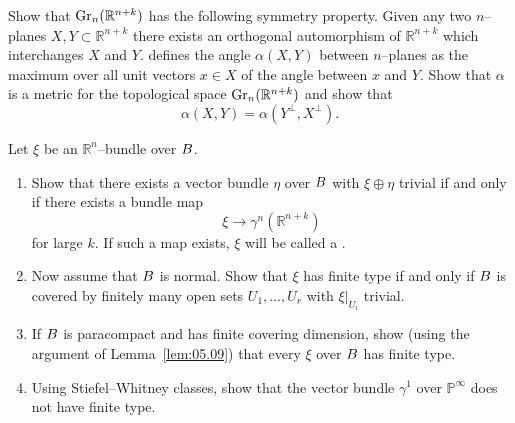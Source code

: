 \documentclass[../main]{subfiles}
\begin{document}
\begin{problem}\label{prob-5-D}
Show that $\operatorname{Gr}_n({\mathbb R}^{n + k})$ has the following symmetry property. Given any two $n$--planes $X, Y \subset {\mathbb R}^{n + k}$ there exists an orthogonal automorphism of ${\mathbb R}^{n + k}$ which interchanges $X$ and $Y$. \cite{whitehead1961} defines the angle $\alpha(X, Y)$ between $n$--planes as the maximum over all unit vectors $x \in X$ of the angle between $x$ and $Y$. Show that $\alpha$ is a metric for the topological space $\operatorname{Gr}_n({\mathbb R}^{n + k})$ and show that \[\alpha(X, Y) = \alpha(Y^\bot, X^\bot).\]
\end{problem}

\begin{problem}\label{prob-5-E}
Let $\xi$ be an ${\mathbb R}^n$--bundle over $B$. 

\begin{enumerate}[label=\arabic*)]
    \item Show that there exists a vector bundle $\eta$ over $B$ with $\xi \oplus \eta$ trivial if and only if there exists a bundle map \[\xi \longrightarrow \gamma^n({\mathbb R}^{n + k})\] for large $k$. If such a map exists, $\xi$ will be called a .
    \item Now assume that $B$ is normal. Show that $\xi$ has finite type if and only if $B$ is covered by finitely many open sets $U_1, \ldots, U_r$ with $\xi |_{U_i}$ trivial.
    \item If $B$ is paracompact and has finite covering dimension, show (using the argument of Lemma~\ref{lem:05.09}) that every $\xi$ over $B$ has finite type.
    \item Using Stiefel--Whitney classes, show that the vector bundle $\gamma^1$ over ${\mathbb P}^\infty$ does not have finite type. 
\end{enumerate} 
\end{problem}
\end{document}
